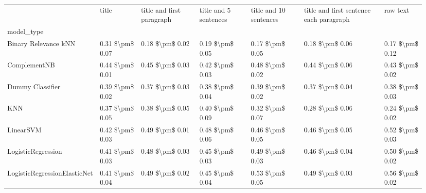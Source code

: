 \begin{tabular}{lllllll}
\toprule
{} &            title & title and first paragraph & title and 5 sentences & title and 10 sentences & title and first sentence each paragraph &             raw text \\
model\_type                      &                  &                           &                       &                        &                                         &                      \\
\midrule
Binary Relevance kNN            &  0.31 \$\textbackslash pm\$ 0.07 &           0.18 \$\textbackslash pm\$ 0.02 &       0.19 \$\textbackslash pm\$ 0.05 &        0.17 \$\textbackslash pm\$ 0.05 &                         0.18 \$\textbackslash pm\$ 0.06 &      0.17 \$\textbackslash pm\$ 0.12 \\
ComplementNB                    &  0.44 \$\textbackslash pm\$ 0.01 &           0.45 \$\textbackslash pm\$ 0.03 &       0.42 \$\textbackslash pm\$ 0.03 &        0.48 \$\textbackslash pm\$ 0.02 &                         0.44 \$\textbackslash pm\$ 0.06 &      0.43 \$\textbackslash pm\$ 0.02 \\
Dummy Classifier                &  0.39 \$\textbackslash pm\$ 0.02 &           0.37 \$\textbackslash pm\$ 0.03 &       0.38 \$\textbackslash pm\$ 0.04 &        0.39 \$\textbackslash pm\$ 0.02 &                         0.37 \$\textbackslash pm\$ 0.04 &      0.38 \$\textbackslash pm\$ 0.03 \\
KNN                             &  0.37 \$\textbackslash pm\$ 0.05 &           0.38 \$\textbackslash pm\$ 0.05 &       0.40 \$\textbackslash pm\$ 0.09 &        0.32 \$\textbackslash pm\$ 0.07 &                         0.28 \$\textbackslash pm\$ 0.06 &      0.24 \$\textbackslash pm\$ 0.02 \\
LinearSVM                       &  0.42 \$\textbackslash pm\$ 0.03 &           0.49 \$\textbackslash pm\$ 0.01 &       0.48 \$\textbackslash pm\$ 0.06 &        0.46 \$\textbackslash pm\$ 0.05 &                         0.46 \$\textbackslash pm\$ 0.05 &      0.52 \$\textbackslash pm\$ 0.03 \\
LogisticRegression              &  0.41 \$\textbackslash pm\$ 0.03 &           0.48 \$\textbackslash pm\$ 0.03 &       0.45 \$\textbackslash pm\$ 0.03 &        0.49 \$\textbackslash pm\$ 0.03 &                         0.46 \$\textbackslash pm\$ 0.04 &      0.50 \$\textbackslash pm\$ 0.02 \\
LogisticRegressionElasticNet    &  0.41 \$\textbackslash pm\$ 0.04 &           0.49 \$\textbackslash pm\$ 0.02 &       0.45 \$\textbackslash pm\$ 0.04 &        0.53 \$\textbackslash pm\$ 0.05 &                         0.49 \$\textbackslash pm\$ 0.03 &      0.56 \$\textbackslash pm\$ 0.02 \\

\end{tabular}
